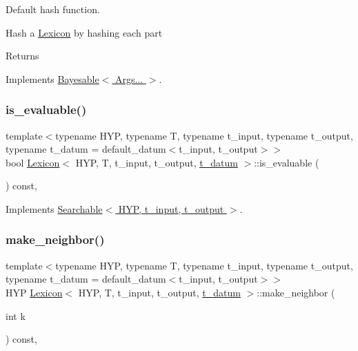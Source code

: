 Default hash function. 

Hash a \hyperlink{class_lexicon}{Lexicon} by hashing each part \begin{DoxyReturn}{Returns}

\end{DoxyReturn}


Implements \hyperlink{class_bayesable_ab77a023d33951448e6edb2e1bc79c5ae}{Bayesable$<$ Args... $>$}.

\mbox{\label{class_lexicon_ad48a8d79b77aed51caff4d10c7de43a1}} 
\subsubsection{\texorpdfstring{is\+\_\+evaluable()}{is\_evaluable()}}
{\footnotesize\ttfamily template$<$typename H\+YP, typename T, typename t\+\_\+input, typename t\+\_\+output, typename t\+\_\+datum = default\+\_\+datum$<$t\+\_\+input, t\+\_\+output$>$$>$ \\
bool \hyperlink{class_lexicon}{Lexicon}$<$ H\+YP, T, t\+\_\+input, t\+\_\+output, \hyperlink{class_bayesable_a7c93a2eeab708378eb321745908718d4}{t\+\_\+datum} $>$\+::is\+\_\+evaluable (\begin{DoxyParamCaption}{ }\end{DoxyParamCaption}) const\hspace{0.3cm}{\ttfamily [inline]}, {\ttfamily [virtual]}}



Implements \hyperlink{class_searchable_aae16f1cb01f140f4033f6f67dc9753b6}{Searchable$<$ H\+Y\+P, t\+\_\+input, t\+\_\+output $>$}.

\mbox{\label{class_lexicon_a2a5b2b625f4c7477c049c1fd8f0a2e3e}} 
\subsubsection{\texorpdfstring{make\+\_\+neighbor()}{make\_neighbor()}}
{\footnotesize\ttfamily template$<$typename H\+YP, typename T, typename t\+\_\+input, typename t\+\_\+output, typename t\+\_\+datum = default\+\_\+datum$<$t\+\_\+input, t\+\_\+output$>$$>$ \\
H\+YP \hyperlink{class_lexicon}{Lexicon}$<$ H\+YP, T, t\+\_\+input, t\+\_\+output, \hyperlink{class_bayesable_a7c93a2eeab708378eb321745908718d4}{t\+\_\+datum} $>$\+::make\+\_\+neighbor (\begin{DoxyParamCaption}\item[{int}]{k }\end{DoxyParamCaption}) const\hspace{0.3cm}{\ttfamily [inline]}, {\ttfamily [virtual]}}




